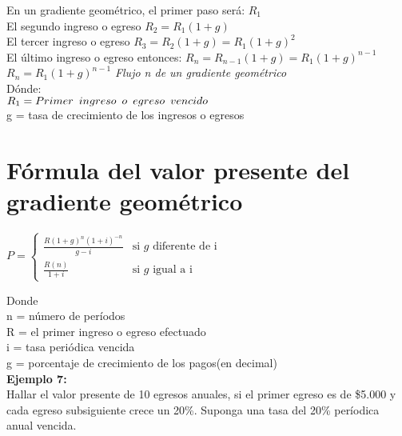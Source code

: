	En un gradiente geométrico, el primer paso será: $R_{1}$\\
	El segundo ingreso o egreso $R_{2} = R_{1}(1+g)$\\
	El tercer ingreso o egreso $R_{3} = R_{2}(1 + g) = R_{1}(1 + g)^{2}$\\
	El último ingreso o egreso entonces: $R_{n} = R_{n-1}(1+g) = R_{1}(1+g)^{n-1}$\\
	$R_{n} = R_{1}(1+g)^{n-1}$ \hspace{35 pt} \textit{Flujo n de un gradiente geométrico}\\
	Dónde:\\
	$R_{1} = Primer \hspace{5 pt} ingreso \hspace{5 pt} o \hspace{5 pt} egreso \hspace{5 pt} vencido$\\
	g = tasa de crecimiento de los ingresos o egresos\\
	
	\section{Fórmula del valor presente del gradiente geométrico}
	\begin{center}
	\fontsize{13}{13}\selectfont
			$P = \left \{ \begin{matrix}\frac{R(1+g)^{n}(1+i)^{-n}}{g-i}& \mbox{si }g\mbox{ diferente de i}
\\ \frac{R(n)}{1+i} & \mbox{si }g\mbox{ igual a i}\end{matrix}\right.$
	\end{center}
	Donde\\
	n = número de períodos\\
	R = el primer ingreso o egreso efectuado\\
	i = tasa periódica vencida\\
	g = porcentaje de crecimiento de los pagos(en decimal)\\
	
	\textbf{Ejemplo 7:}\\
	Hallar el valor presente de 10 egresos anuales, si el primer egreso es de \$5.000 y cada egreso subsiguiente crece un 20\%. Suponga una tasa del 20\% períodica anual vencida.
	
	\clearpage
	
